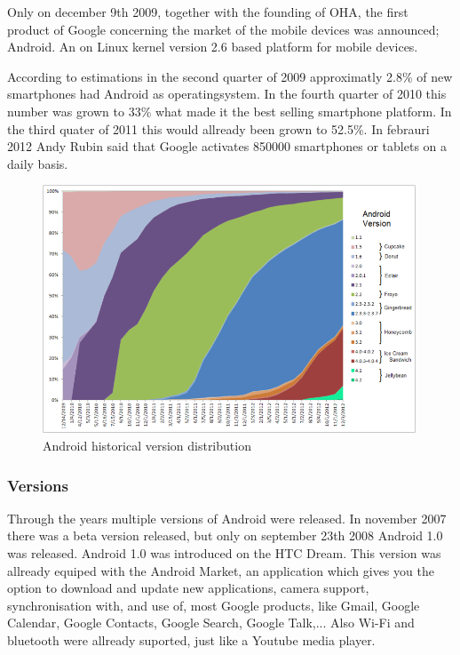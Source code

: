 \documentclass[a4paper,12pt]{report}
\begin{document}
Only on december 9th 2009, together with the founding of OHA, the first product of Google concerning the market of the mobile devices was announced; Android. An on Linux 
kernel version 2.6 based platform for mobile devices.

According to estimations in the second quarter of 2009 approximatly 2.8\% of new smartphones had Android as operatingsystem. In the fourth quarter of 2010 this number
was grown to 33\% what made it the best selling smartphone platform. In the third quater of 2011 this would allready been grown to 52.5\%. In febrauri 2012 Andy Rubin
said that Google activates 850000 smartphones or tablets on a daily basis. 
\begin{figure}
  \centering
    \includegraphics[width=0.99\textwidth]{images/Android_historical_version_distribution.png}
  \caption{Android historical version distribution}
\end{figure}

\subsubsection{Versions}
Through the years multiple versions of Android were released. In november 2007 there was a beta version released, but only on september 23th 2008 Android 1.0 was released.
Android 1.0 was introduced on the HTC Dream. This version was allready equiped with the Android Market, an application which gives you the option to download and update
new applications, camera support, synchronisation with, and use of, most Google products, like Gmail, Google Calendar, Google Contacts, Google Search, Google Talk,... 
Also Wi-Fi and bluetooth were allready suported, just like a Youtube media player.
\end{document}
